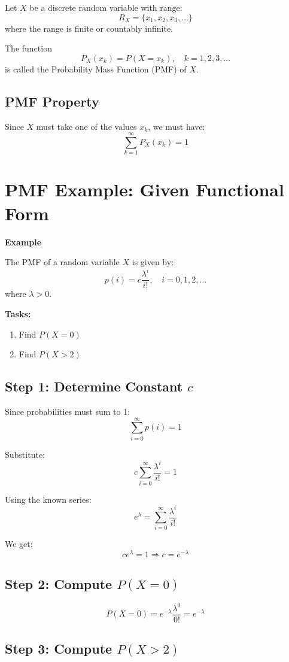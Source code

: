\documentclass[12pt]{article}
\begin{document}
Let $X$ be a discrete random variable with range:
\[
R_X = \{x_1, x_2, x_3, \dots\}
\]
where the range is finite or countably infinite.

The function
\[
P_X(x_k) = P(X = x_k), \quad k = 1,2,3,\dots
\]
is called the Probability Mass Function (PMF) of $X$.

\subsection{PMF Property}

Since $X$ must take one of the values $x_k$, we must have:
\[
\sum_{k=1}^{\infty} P_X(x_k) = 1
\]

\section{PMF Example: Given Functional Form}

\textbf{Example}

The PMF of a random variable $X$ is given by:
\[
p(i) = c \frac{\lambda^i}{i!}, \quad i = 0,1,2,\dots
\]
where $\lambda > 0$.

\textbf{Tasks:}
\begin{enumerate}
    \item Find $P(X=0)$
    \item Find $P(X>2)$
\end{enumerate}

\subsection*{Step 1: Determine Constant $c$}

Since probabilities must sum to 1:
\[
\sum_{i=0}^{\infty} p(i) = 1
\]

Substitute:
\[
c \sum_{i=0}^{\infty} \frac{\lambda^i}{i!} = 1
\]

Using the known series:
\[
e^{\lambda} = \sum_{i=0}^{\infty} \frac{\lambda^i}{i!}
\]

We get:
\[
c e^{\lambda} = 1 \Rightarrow c = e^{-\lambda}
\]

\subsection*{Step 2: Compute $P(X=0)$}

\[
P(X=0) = e^{-\lambda} \frac{\lambda^0}{0!} = e^{-\lambda}
\]

\subsection*{Step 3: Compute $P(X>2)$}
\end{document}
